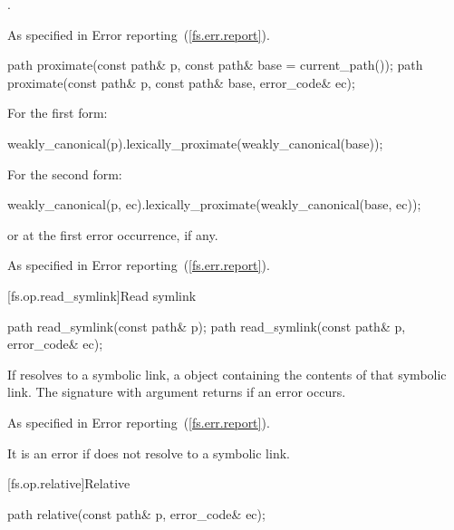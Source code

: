 \begin{itemdescr}
\pnum
\returns {}.

\pnum
\throws As specified in Error reporting~(\ref{fs.err.report}).
\end{itemdescr}

%
\begin{itemdecl}
path proximate(const path& p, const path& base = current_path());
path proximate(const path& p, const path& base, error_code& ec);
\end{itemdecl}

\begin{itemdescr}
\pnum
\returns For the first form:
\begin{codeblock}
weakly_canonical(p).lexically_proximate(weakly_canonical(base));
\end{codeblock}
  For the second form:
\begin{codeblock}
weakly_canonical(p, ec).lexically_proximate(weakly_canonical(base, ec));
\end{codeblock}
  or  at the first error occurrence, if any.

\pnum
\throws As specified in Error reporting~(\ref{fs.err.report}).
\end{itemdescr}

[fs.op.read_symlink]{Read symlink}

%
\begin{itemdecl}
path read_symlink(const path& p);
path read_symlink(const path& p, error_code& ec);
\end{itemdecl}

\begin{itemdescr}
\pnum
\returns If  resolves to a symbolic
  link, a  object containing the contents of that symbolic
  link. The signature with argument 
  returns  if an error occurs.

\pnum
\throws As specified in Error reporting~(\ref{fs.err.report}). \begin{note} It is an error if  does not
  resolve to a symbolic link. \end{note}
\end{itemdescr}

[fs.op.relative]{Relative}

%
\begin{itemdecl}
path relative(const path& p, error_code& ec);
\end{itemdecl}

